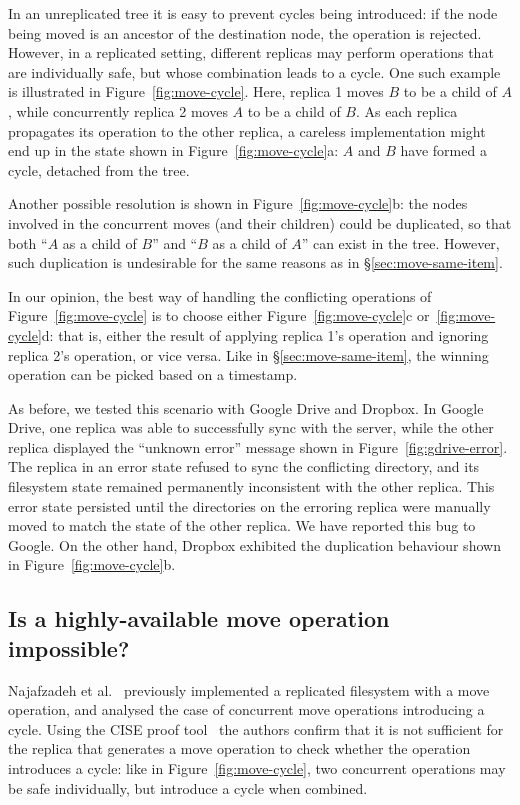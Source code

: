 \documentclass[10pt,journal,compsoc]{IEEEtran}
\begin{document}
In an unreplicated tree it is easy to prevent cycles being introduced: if the node being moved is an ancestor of the destination node, the operation is rejected.
However, in a replicated setting, different replicas may perform operations that are individually safe, but whose combination leads to a cycle.
One such example is illustrated in Figure~\ref{fig:move-cycle}.
Here, replica 1 moves $B$ to be a child of $A$, while concurrently replica 2 moves $A$ to be a child of $B$.
As each replica propagates its operation to the other replica, a careless implementation might end up in the state shown in Figure~\ref{fig:move-cycle}a: $A$ and $B$ have formed a cycle, detached from the tree.

Another possible resolution is shown in Figure~\ref{fig:move-cycle}b: the nodes involved in the concurrent moves (and their children) could be duplicated, so that both ``$A$ as a child of $B$'' and ``$B$ as a child of $A$'' can exist in the tree.
However, such duplication is undesirable for the same reasons as in \S\ref{sec:move-same-item}.

In our opinion, the best way of handling the conflicting operations of Figure~\ref{fig:move-cycle} is to choose either Figure~\ref{fig:move-cycle}c or~\ref{fig:move-cycle}d: that is, either the result of applying replica 1's operation and ignoring replica 2's operation, or vice versa.
Like in \S\ref{sec:move-same-item}, the winning operation can be picked based on a timestamp.

As before, we tested this scenario with Google Drive and Dropbox.
In Google Drive, one replica was able to successfully sync with the server, while the other replica displayed the ``unknown error'' message shown in Figure~\ref{fig:gdrive-error}.
The replica in an error state refused to sync the conflicting directory, and its filesystem state remained permanently inconsistent with the other replica.
This error state persisted until the directories on the erroring replica were manually moved to match the state of the other replica.
We have reported this bug to Google.
On the other hand, Dropbox exhibited the duplication behaviour shown in Figure~\ref{fig:move-cycle}b.

\subsection{Is a highly-available move operation impossible?}\label{sec:impossibility}

Najafzadeh et al.~\cite{Najafzadeh:2017vk,Najafzadeh:2018bw} previously implemented a replicated filesystem with a move operation, and analysed the case of concurrent move operations introducing a cycle.
Using the CISE proof tool~\cite{DBLP:conf/popl/GotsmanYFNS16,Najafzadeh:2016fi} the authors confirm that it is not sufficient for the replica that generates a move operation to check whether the operation introduces a cycle: like in Figure~\ref{fig:move-cycle}, two concurrent operations may be safe individually, but introduce a cycle when combined.
\end{document}
